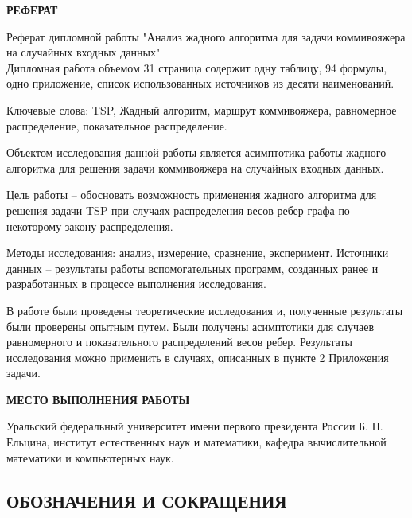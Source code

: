 \documentclass[a4paper, 14pt]{extarticle}
\numberwithin{equation}{section}
\begin{document}
\newpage

\begin{center}
 \textbf{РЕФЕРАТ}
\end{center}

Реферат дипломной работы "Анализ жадного алгоритма для задачи 
коммивояжера на случайных входных данных"\\

Дипломная работа объемом 31 страница содержит одну таблицу, 94 формулы, одно приложение, список использованных источников из десяти наименований.

Ключевые слова: TSP, Жадный алгоритм, маршрут коммивояжера, равномерное распределение, показательное распределение.

Объектом исследования данной работы является асимптотика работы жадного алгоритма для решения задачи коммивояжера на случайных входных данных. 

Цель работы -- обосновать возможность применения жадного алгоритма для решения задачи TSP при случаях распределения весов ребер графа по некоторому закону распределения. 

Методы исследования: анализ, измерение, сравнение, эксперимент. Источники данных -- результаты работы вспомогательных программ, созданных ранее и разработанных в процессе выполнения исследования.

В работе были проведены теоретические исследования и, полученные результаты были проверены опытным путем. Были получены асимптотики для случаев равномерного и показательного распределений весов ребер. Результаты исследования можно применить в случаях, описанных в пункте 2 Приложения задачи.\\

\newpage

\begin{center}
 \textbf{МЕСТО ВЫПОЛНЕНИЯ РАБОТЫ}
\end{center}

Уральский федеральный университет имени первого президента России Б. Н. Ельцина, институт естественных наук и математики, кафедра вычислительной математики и компьютерных наук.

\newpage

\renewcommand{\contentsname}{\begin{center}Содержание\end{center}}
\tableofcontents

\newpage

\begin{center}
\chapter{\textbf{ОБОЗНАЧЕНИЯ И СОКРАЩЕНИЯ}}
\end{center}
\end{document}
